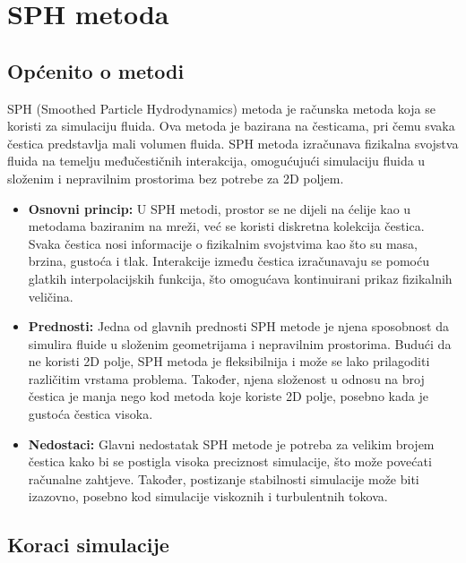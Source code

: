 \documentclass[diplomskirad]{fer}
\begin{document}
    \section{SPH metoda}\label{sec:sph-metoda}

    \subsection{Općenito o metodi}\label{subsec:opcenito-o-metodi}

    SPH\cite{SPHmethod} (Smoothed Particle Hydrodynamics) metoda je računska metoda koja se koristi za simulaciju fluida.
    Ova metoda je bazirana na česticama, pri čemu svaka čestica predstavlja mali volumen fluida.
    SPH metoda izračunava fizikalna svojstva fluida na temelju međučestičnih interakcija, omogućujući simulaciju fluida u složenim i nepravilnim prostorima bez potrebe za 2D poljem.

    \begin{itemize}
        \item \textbf{Osnovni princip:} U SPH metodi, prostor se ne dijeli na ćelije kao u metodama baziranim na mreži, već se koristi diskretna kolekcija čestica.
        Svaka čestica nosi informacije o fizikalnim svojstvima kao što su masa, brzina, gustoća i tlak.
        Interakcije između čestica izračunavaju se pomoću glatkih interpolacijskih funkcija, što omogućava kontinuirani prikaz fizikalnih veličina.
        \item \textbf{Prednosti:} Jedna od glavnih prednosti SPH metode je njena sposobnost da simulira fluide u složenim geometrijama i nepravilnim prostorima.
        Budući da ne koristi 2D polje, SPH metoda je fleksibilnija i može se lako prilagoditi različitim vrstama problema.
        Također, njena složenost u odnosu na broj čestica je manja nego kod metoda koje koriste 2D polje, posebno kada je gustoća čestica visoka.
        \item \textbf{Nedostaci:} Glavni nedostatak SPH metode je potreba za velikim brojem čestica kako bi se postigla visoka preciznost simulacije, što može povećati računalne zahtjeve.
        Također, postizanje stabilnosti simulacije može biti izazovno, posebno kod simulacije viskoznih i turbulentnih tokova.
    \end{itemize}

    \newpage

    \subsection{Koraci simulacije}\label{subsec:koraci-simulacije}
\end{document}
